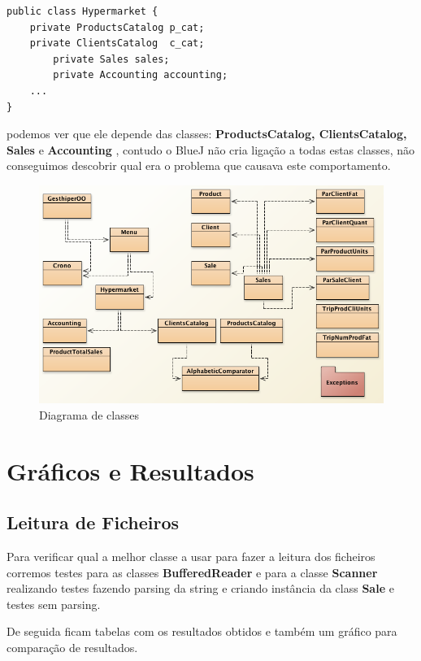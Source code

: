 \documentclass[10pt] {article}
\begin{document}
\begin{lstlisting}
public class Hypermarket {
	private ProductsCatalog p_cat;
   	private ClientsCatalog  c_cat;
    	private Sales sales;
    	private Accounting accounting;
	...
}
\end{lstlisting}

\par podemos ver que ele depende das classes: \color{blue} \textbf{ProductsCatalog, ClientsCatalog, Sales} \color{black} e
\color{blue} \textbf{Accounting} \color{black}, contudo o BlueJ não cria ligação a todas estas classes, não conseguimos
descobrir qual era o problema que causava este comportamento.

\begin{figure}[ht!]
\centering
\includegraphics[width=150mm]{diagram.png}
\caption{Diagrama de classes}
\label{fig:sales}
\end{figure}

\newpage
\section{Gráficos e Resultados}
\subsection{Leitura de Ficheiros}

\par Para verificar qual a melhor classe a usar para fazer a leitura dos ficheiros corremos testes para as classes
\color{blue} \textbf{BufferedReader} \color{black} e para a classe\color{blue} \textbf{Scanner} \color{black} realizando testes 
fazendo parsing da string e criando instância da class \color{blue} \textbf{Sale} \color{black} e testes sem parsing.
\par De seguida ficam tabelas com os resultados obtidos e também um gráfico para comparação de resultados.
\end{document}
